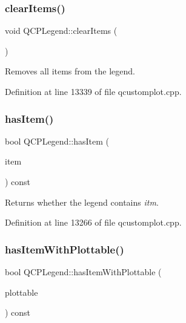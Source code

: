 \mbox{\label{class_q_c_p_legend_a24795c7250eb5214fcea16b7217b4dfb}} 
\subsubsection{\texorpdfstring{clear\+Items()}{clearItems()}}
{\footnotesize\ttfamily void Q\+C\+P\+Legend\+::clear\+Items (\begin{DoxyParamCaption}{ }\end{DoxyParamCaption})}

Removes all items from the legend. 

Definition at line 13339 of file qcustomplot.\+cpp.

\mbox{\label{class_q_c_p_legend_ad0f698e33db454a6c103b5206740e599}} 
\subsubsection{\texorpdfstring{has\+Item()}{hasItem()}}
{\footnotesize\ttfamily bool Q\+C\+P\+Legend\+::has\+Item (\begin{DoxyParamCaption}\item[{\hyperlink{class_q_c_p_abstract_legend_item}{Q\+C\+P\+Abstract\+Legend\+Item} $\ast$}]{item }\end{DoxyParamCaption}) const}

Returns whether the legend contains {\itshape itm}. 

Definition at line 13266 of file qcustomplot.\+cpp.

\mbox{\label{class_q_c_p_legend_a4b90a442af871582df85c2bc13f91e88}} 
\subsubsection{\texorpdfstring{has\+Item\+With\+Plottable()}{hasItemWithPlottable()}}
{\footnotesize\ttfamily bool Q\+C\+P\+Legend\+::has\+Item\+With\+Plottable (\begin{DoxyParamCaption}\item[{const \hyperlink{class_q_c_p_abstract_plottable}{Q\+C\+P\+Abstract\+Plottable} $\ast$}]{plottable }\end{DoxyParamCaption}) const}

